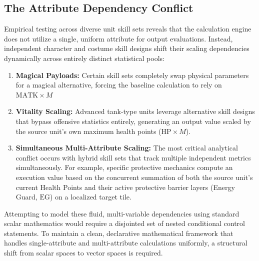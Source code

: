 \documentclass[twocolumn,10pt]{article}
\begin{document}
\subsection{The Attribute Dependency Conflict}
Empirical testing across diverse unit skill sets reveals that the calculation engine does not utilize a single, uniform attribute for output evaluations. Instead, independent character and costume skill designs shift their scaling dependencies dynamically across entirely distinct statistical pools:
\begin{enumerate}
    \item \textbf{Magical Payloads:} Certain skill sets completely swap physical parameters for a magical alternative, forcing the baseline calculation to rely on $\text{MATK} \times M$
    \item \textbf{Vitality Scaling:} Advanced tank-type units leverage alternative skill designs that bypass offensive statistics entirely, generating an output value scaled by the source unit's own maximum health points ($\text{HP} \times M$).
    \item \textbf{Simultaneous Multi-Attribute Scaling:} The most critical analytical conflict occurs with hybrid skill sets that track multiple independent metrics simultaneously. For example, specific protective mechanics compute an execution value based on the concurrent summation of both the source unit's current Health Points and their active protective barrier layers (Energy Guard, $\text{EG}$) on a localized target tile.
\end{enumerate}
Attempting to model these fluid, multi-variable dependencies using standard scalar mathematics would require a disjointed set of nested conditional control statements. To maintain a clean, declarative mathematical framework that handles single-attribute and multi-attribute calculations uniformly, a structural shift from scalar spaces to vector spaces is required.
\end{document}
